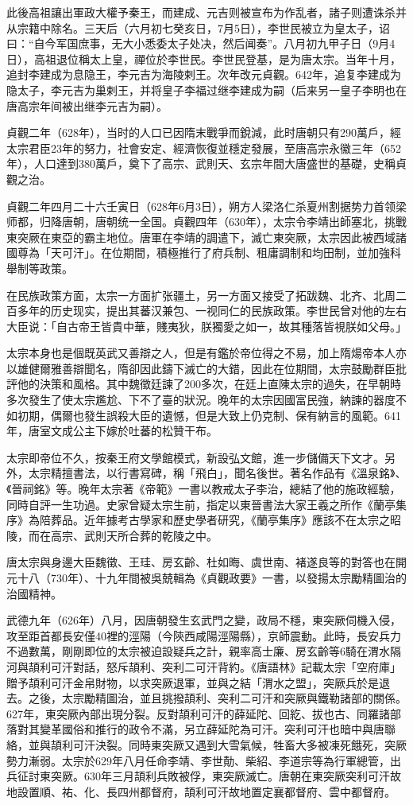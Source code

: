此後高祖讓出軍政大權予秦王，而建成、元吉则被宣布为作乱者，諸子则遭诛杀并从宗籍中除名。三天后（六月初七癸亥日，7月5日），李世民被立为皇太子，诏曰：“自今军国庶事，无大小悉委太子处决，然后闻奏”。八月初九甲子日（9月4日），高祖退位稱太上皇，禪位於李世民。李世民登基，是为唐太宗。当年十月，追封李建成为息隐王，李元吉为海陵剌王。次年改元貞觀。642年，追复李建成为隐太子，李元吉为巢剌王，并将皇子李福过继李建成为嗣（后来另一皇子李明也在唐高宗年间被出继李元吉为嗣）。

貞觀二年（628年），当时的人口已因隋末戰爭而銳減，此时唐朝只有290萬戶，經太宗君臣23年的努力，社會安定、經濟恢復並穩定發展，至唐高宗永徽三年（652年），人口達到380萬戶，奠下了高宗、武則天、玄宗年間大唐盛世的基礎，史稱貞觀之治。

貞觀二年四月二十六壬寅日（628年6月3日），朔方人梁洛仁杀夏州割据势力首领梁师都，归降唐朝，唐朝统一全国。貞觀四年（630年），太宗令李靖出師塞北，挑戰東突厥在東亞的霸主地位。唐軍在李靖的調遣下，滅亡東突厥，太宗因此被西域諸國尊為「天可汗」。在位期間，積極推行了府兵制、租庸調制和均田制，並加強科舉制等政策。

在民族政策方面，太宗一方面扩张疆土，另一方面又接受了拓跋魏、北齐、北周二百多年的历史现实，提出其蕃汉兼包、一视同仁的民族政策。李世民曾对他的左右大臣说：「自古帝王皆貴中華，賤夷狄，朕獨愛之如一，故其種落皆視朕如父母。」

太宗本身也是個既英武又善辯之人，但是有鑑於帝位得之不易，加上隋煬帝本人亦以雄健爾雅善辯聞名，隋卻因此鑄下滅亡的大錯，因此在位期間，太宗鼓勵群臣批評他的決策和風格。其中魏徵廷諫了200多次，在廷上直陳太宗的過失，在早朝時多次發生了使太宗尷尬、下不了臺的狀況。晚年的太宗因國富民強，納諫的器度不如初期，偶爾也發生誤殺大臣的遺憾，但是大致上仍克制、保有納言的風範。641年，唐室文成公主下嫁於吐蕃的松贊干布。

太宗即帝位不久，按秦王府文學館模式，新設弘文館，進一步儲備天下文才。另外，太宗精擅書法，以行書寫碑，稱「飛白」，聞名後世。著名作品有《溫泉銘》、《晉祠銘》等。晚年太宗著《帝範》一書以教戒太子李治，總結了他的施政經驗，同時自評一生功過。史家曾疑太宗生前，指定以東晉書法大家王羲之所作《蘭亭集序》為陪葬品。近年據考古學家和歷史學者研究，《蘭亭集序》應該不在太宗之昭陵，而在高宗、武則天所合葬的乾陵之中。

唐太宗與身邊大臣魏徵、王珪、房玄齡、杜如晦、虞世南、褚遂良等的對答也在開元十八（730年）、十九年間被吳兢輯為《貞觀政要》一書，以發揚太宗勵精圖治的治國精神。

武德九年（626年）八月，因唐朝發生玄武門之變，政局不穩，東突厥伺機入侵，攻至距首都長安僅40裡的涇陽（今陝西咸陽涇陽縣），京師震動。此時，長安兵力不過數萬，剛剛即位的太宗被迫設疑兵之計，親率高士廉、房玄齡等6騎在渭水隔河與頡利可汗對話，怒斥頡利、突利二可汗背約。《唐語林》記載太宗「空府庫」贈予頡利可汗金帛財物，以求突厥退軍，並與之結「渭水之盟」，突厥兵於是退去。之後，太宗勵精圖治，並且挑撥頡利、突利二可汗和突厥與鐵勒諸部的關係。627年，東突厥內部出現分裂。反對頡利可汗的薛延陀、回紇、拔也古、同羅諸部落對其變革國俗和推行的政令不滿，另立薛延陀為可汗。突利可汗也暗中與唐聯絡，並與頡利可汗決裂。同時東突厥又遇到大雪氣候，牲畜大多被凍死餓死，突厥勢力漸弱。太宗於629年八月任命李靖、李世勣、柴紹、李道宗等為行軍總管，出兵征討東突厥。630年三月頡利兵敗被俘，東突厥滅亡。唐朝在東突厥突利可汗故地設置順、祐、化、長四州都督府，頡利可汗故地置定襄都督府、雲中都督府。

